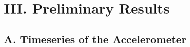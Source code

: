 \documentclass{beamer}
\begin{document}
%
%
%
%
%
%
%
%
%

\section{III. Preliminary Results}



\subsection{A. Timeseries of the Accelerometer}
\end{document}
